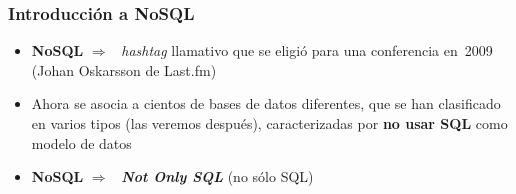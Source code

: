 \documentclass[14pt]{beamer}
\newcommand{\ra}{{\color{blue} $\Rightarrow${}~{}}}
\begin{document}
\begin{frame}
  \frametitle{Introducción a NoSQL}
\begin{itemize}
\item {\bf NoSQL} \ra{} {\em hashtag\/} llamativo que se
  eligió para una conferencia en~2009 (Johan Oskarsson de Last.fm)
\item Ahora se asocia a cientos de bases de datos diferentes,
  que se han clasificado en varios tipos (las veremos después),
  caracterizadas por {\bf no usar SQL} como modelo de datos
\item {\bf NoSQL} \ra{} {\bfseries\itshape Not Only SQL} (no sólo SQL)
  \end{itemize}
\end{frame}
\end{document}
